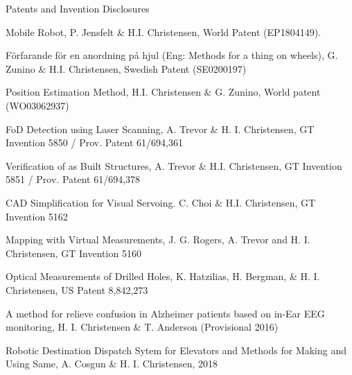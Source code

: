 \documentclass{article}
\begin{document}
\begin{cv}
\begin{cvlist}{Patents and Invention Disclosures}
\item Mobile Robot, P. Jensfelt \& H.I. Christensen, World Patent
  (EP1804149).
\item F{\"o}rfarande f{\"o}r en anordning p{\aa} hjul (Eng: Methods
  for a thing on wheels), G. Zunino \& H.I. Christensen, Swedish
  Patent (SE0200197)
\item Position Estimation Method, H.I. Christensen \& G. Zunino, World
  patent (WO03062937)
\item FoD Detection using Laser Scanning, A. Trevor \&
  H. I. Christensen, GT Invention 5850 / Prov. Patent 61/694,361
\item Verification of as Built Structures, A. Trevor \&
  H.I. Christensen, GT Invention 5851 / Prov. Patent 61/694,378
\item CAD Simplification for Visual Servoing. C. Choi \&
  H.I. Christensen, GT Invention 5162
\item Mapping with Virtual Measurements, J. G. Rogers, A. Trevor and
  H. I. Christensen, GT Invention 5160
\item  Optical Measurements of Drilled Holes, K. Hatzilias, H. Bergman,
  \& H. I. Christensen, US Patent 8,842,273
\item  A method for relieve confusion in Alzheimer patients based on
  in-Ear EEG monitoring, H. I. Christensen \& T. Anderson
  (Provisional 2016)
\item Robotic Destination Dispatch Sytem for Elevators and Methods for
  Making and Using Same, A. Cosgun \& H. I. Christensen, 2018
\end{cvlist}




\end{cv}
\end{document}
